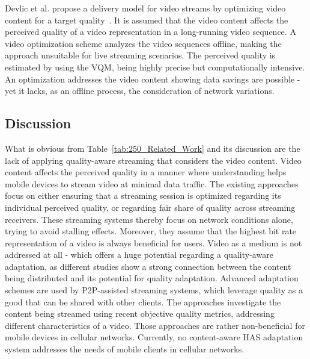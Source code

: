 Devlic et al. propose a delivery model for video streams by optimizing video content for a target quality~\cite{Devlic2015}.
It is assumed that the video content affects the perceived quality of a video representation in a long-running video sequence.
A video optimization scheme analyzes the video sequences offline, making the approach unsuitable for live streaming scenarios.
The perceived quality is estimated by using the \ac{VQM}, being highly precise but computationally intensive.
An optimization addresses the video content showing data savings are possible - yet it lacks, as an offline process, the consideration of network variations.
\subsection{Discussion}
What is obvious from Table~\ref{tab:250_Related_Work} and its discussion are the lack of applying quality-aware streaming that considers the video content.
Video content affects the perceived quality in a manner where understanding helps mobile devices to stream video at minimal data traffic.
The existing approaches focus on either ensuring that a streaming session is optimized regarding its individual perceived quality, or regarding fair share of quality across streaming receivers.
These streaming systems thereby focus on network conditions alone, trying to avoid stalling effects.
Moreover, they assume that the highest bit rate representation of a video is always beneficial for users.
Video as a medium is not addressed at all - which offers a huge potential regarding a quality-aware adaptation, as different studies show a strong connection between the content being distributed and its potential for quality adaptation.
Advanced adaptation schemes are used by \ac{P2P}-assisted streaming systems, which leverage quality as a good that can be shared with other clients.
The approaches investigate the content being streamed using recent objective quality metrics, addressing different characteristics of a video.
Those approaches are rather non-beneficial for mobile devices in cellular networks. 
Currently, no content-aware \ac{HAS} adaptation system addresses the needs of mobile clients in cellular networks.